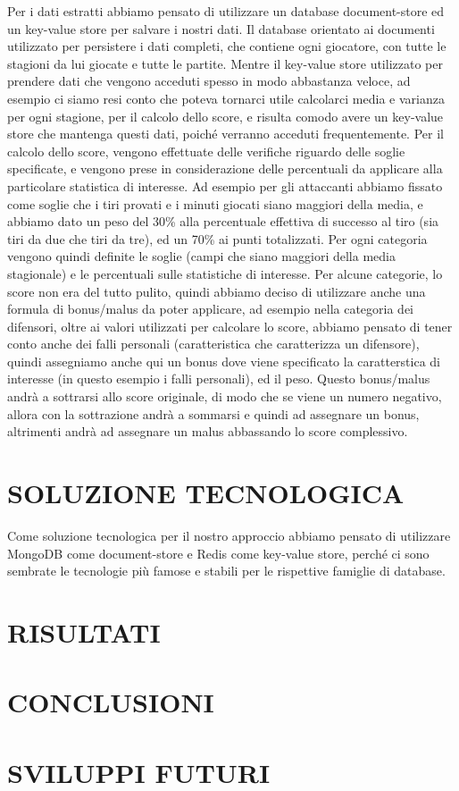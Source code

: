 \documentclass[10pt,a4paper,onecolumn]{article}
\begin{document}
Per i dati estratti abbiamo pensato di utilizzare un database document-store ed un key-value store per salvare i nostri dati. \newline
Il database orientato ai documenti utilizzato per persistere i dati completi, che contiene ogni giocatore, con tutte le stagioni da lui giocate e tutte le partite.\newline 
Mentre il key-value store utilizzato per prendere dati che vengono acceduti spesso in modo abbastanza veloce, ad esempio ci siamo resi conto che poteva tornarci utile calcolarci media e varianza per ogni stagione, per il calcolo dello score, e risulta comodo avere un key-value store che mantenga questi dati, poiché verranno acceduti frequentemente. \newline
Per il calcolo dello score, vengono effettuate delle verifiche riguardo delle soglie specificate, e vengono prese in considerazione delle percentuali da applicare alla particolare statistica di interesse. Ad esempio per gli attaccanti abbiamo fissato come soglie che i tiri provati e i minuti giocati siano maggiori della media, e abbiamo dato un peso del 30\% alla percentuale effettiva di successo al tiro (sia tiri da due che tiri da tre), ed un 70\% ai punti totalizzati.\newline
Per ogni categoria vengono quindi definite le soglie (campi che siano maggiori della media stagionale) e le percentuali sulle statistiche di interesse. Per alcune categorie, lo score non era del tutto pulito, quindi abbiamo deciso di utilizzare anche una formula di bonus/malus da poter applicare, ad esempio nella categoria dei difensori, oltre ai valori utilizzati per calcolare lo score, abbiamo pensato di tener conto anche dei falli personali (caratteristica che caratterizza un difensore), quindi assegniamo anche qui un bonus dove viene specificato la caratterstica di interesse (in questo esempio i falli personali), ed il peso. Questo bonus/malus andrà a sottrarsi allo score originale, di modo che se viene un numero negativo, allora con la sottrazione andrà a sommarsi e quindi ad assegnare un bonus, altrimenti andrà ad assegnare un malus abbassando lo score complessivo.

\section{SOLUZIONE TECNOLOGICA}

Come soluzione tecnologica per il nostro approccio abbiamo pensato di utilizzare MongoDB come document-store e Redis come key-value store, perché ci sono sembrate le tecnologie più famose e stabili per le rispettive famiglie di database.\newline


\section{RISULTATI}
\section{CONCLUSIONI}

\section{SVILUPPI FUTURI}
\end{document}
